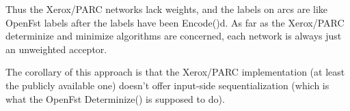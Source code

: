 \documentclass[letterpaper,12pt]{article}
\begin{document}
\noindent
Thus the Xerox/PARC networks lack weights, and the labels on arcs are like OpenFst
labels after the labels have been Encode()d.  As far as the Xerox/PARC determinize and
minimize algorithms are concerned, each network is always just an unweighted acceptor.

The corollary of this approach is that the Xerox/PARC implementation (at least the
publicly available one) doesn't offer input-side sequentialization (which is what
the OpenFst Determinize() is supposed to do).
\end{document}
